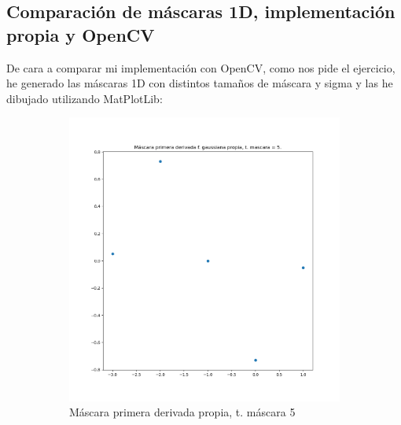 \documentclass[12pt, spanish]{article}
\begin{document}
\subsection{Comparación de máscaras 1D, implementación propia y OpenCV}

De cara a comparar mi implementación con OpenCV, como nos pide el ejercicio, he generado las máscaras 1D con distintos tamaños de máscara y sigma y las he dibujado utilizando MatPlotLib:


\begin{figure}[H]
  \centering
	\begin{subfigure}[t]{0.4\textwidth}
		\centering
		\includegraphics[width = \textwidth]{cmp-p5.png}
 		 \caption{Máscara primera derivada propia, t. máscara 5}
	\end{subfigure}
	\hspace{1cm}
	\begin{subfigure}[t]{0.4\textwidth}
		\centering

\end{subfigure}
\end{figure}
\end{document}
